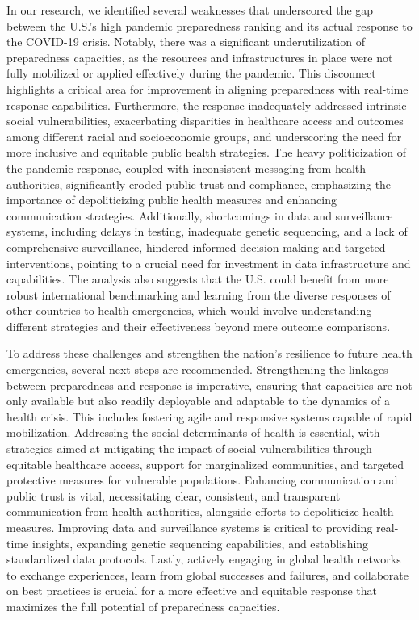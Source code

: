 \documentclass[
  letterpaper,
  DIV=11,
  numbers=noendperiod]{scrartcl}
\begin{document}
In our research, we identified several weaknesses that underscored the
gap between the U.S.'s high pandemic preparedness ranking and its actual
response to the COVID-19 crisis. Notably, there was a significant
underutilization of preparedness capacities, as the resources and
infrastructures in place were not fully mobilized or applied effectively
during the pandemic. This disconnect highlights a critical area for
improvement in aligning preparedness with real-time response
capabilities. Furthermore, the response inadequately addressed intrinsic
social vulnerabilities, exacerbating disparities in healthcare access
and outcomes among different racial and socioeconomic groups, and
underscoring the need for more inclusive and equitable public health
strategies. The heavy politicization of the pandemic response, coupled
with inconsistent messaging from health authorities, significantly
eroded public trust and compliance, emphasizing the importance of
depoliticizing public health measures and enhancing communication
strategies. Additionally, shortcomings in data and surveillance systems,
including delays in testing, inadequate genetic sequencing, and a lack
of comprehensive surveillance, hindered informed decision-making and
targeted interventions, pointing to a crucial need for investment in
data infrastructure and capabilities. The analysis also suggests that
the U.S. could benefit from more robust international benchmarking and
learning from the diverse responses of other countries to health
emergencies, which would involve understanding different strategies and
their effectiveness beyond mere outcome comparisons.

To address these challenges and strengthen the nation's resilience to
future health emergencies, several next steps are recommended.
Strengthening the linkages between preparedness and response is
imperative, ensuring that capacities are not only available but also
readily deployable and adaptable to the dynamics of a health crisis.
This includes fostering agile and responsive systems capable of rapid
mobilization. Addressing the social determinants of health is essential,
with strategies aimed at mitigating the impact of social vulnerabilities
through equitable healthcare access, support for marginalized
communities, and targeted protective measures for vulnerable
populations. Enhancing communication and public trust is vital,
necessitating clear, consistent, and transparent communication from
health authorities, alongside efforts to depoliticize health measures.
Improving data and surveillance systems is critical to providing
real-time insights, expanding genetic sequencing capabilities, and
establishing standardized data protocols. Lastly, actively engaging in
global health networks to exchange experiences, learn from global
successes and failures, and collaborate on best practices is crucial for
a more effective and equitable response that maximizes the full
potential of preparedness capacities.
\end{document}
